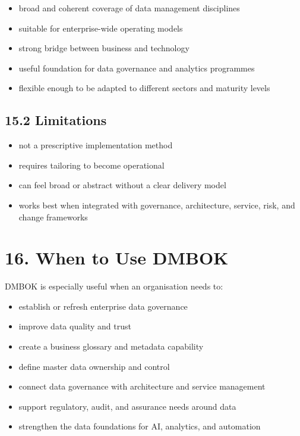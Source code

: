 \documentclass[
  letterpaper,
  DIV=11,
  numbers=noendperiod]{scrartcl}
\providecommand{\tightlist}{%
  \setlength{\itemsep}{0pt}\setlength{\parskip}{0pt}}
\begin{document}
\begin{itemize}
\tightlist
\item
  broad and coherent coverage of data management disciplines
\item
  suitable for enterprise-wide operating models
\item
  strong bridge between business and technology
\item
  useful foundation for data governance and analytics programmes
\item
  flexible enough to be adapted to different sectors and maturity levels
\end{itemize}

\subsection{15.2 Limitations}\label{limitations}

\begin{itemize}
\tightlist
\item
  not a prescriptive implementation method
\item
  requires tailoring to become operational
\item
  can feel broad or abstract without a clear delivery model
\item
  works best when integrated with governance, architecture, service,
  risk, and change frameworks
\end{itemize}

\section{16. When to Use DMBOK}\label{when-to-use-dmbok}

DMBOK is especially useful when an organisation needs to:

\begin{itemize}
\tightlist
\item
  establish or refresh enterprise data governance
\item
  improve data quality and trust
\item
  create a business glossary and metadata capability
\item
  define master data ownership and control
\item
  connect data governance with architecture and service management
\item
  support regulatory, audit, and assurance needs around data
\item
  strengthen the data foundations for AI, analytics, and automation
\end{itemize}
\end{document}
